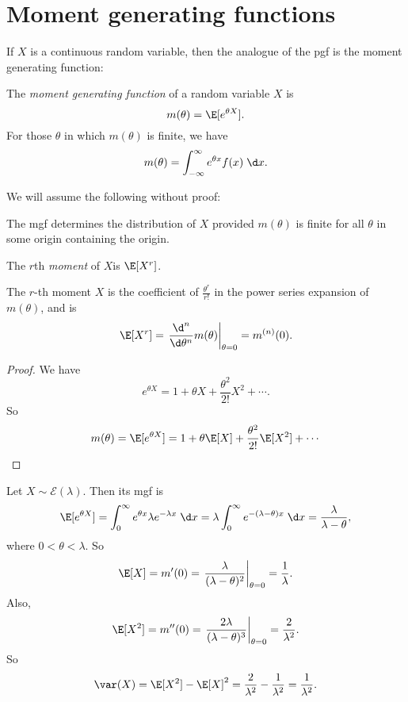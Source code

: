 \documentclass[a4paper]{article}
\begin{document}
\section{Moment generating functions}
If $X$ is a continuous random variable, then the analogue of the pgf is the moment generating function:
\begin{defi}
  The \emph{moment generating function} of a random variable $X$ is
  \[
    m(\theta) = \E[e^{\theta X}].
  \]
  For those $\theta$ in which $m(\theta)$ is finite, we have
  \[
    m(\theta) = \int_{-\infty}^\infty e^{\theta x}f(x)\;\d x.
  \]
\end{defi}

We will assume the following without proof:
\begin{thm}
  The mgf determines the distribution of $X$ provided $m(\theta)$ is finite for all $\theta$ in some origin containing the origin.
\end{thm}

\begin{defi}[Moment]
  The $r$th \emph{moment} of $X$is $\E[X^r]$.
\end{defi}

\begin{thm}[]
  The $r$-th moment $X$ is the coefficient of $\frac{\theta^r}{r!}$ in the power series expansion of $m(\theta)$, and is
  \[
    \E[X^r] = \left.\frac{\d ^n}{\d \theta^n}m(\theta)\right|_{\theta = 0} = m^{(n)}(0).
  \]
\end{thm}

\begin{proof}
  We have
  \[
    e^{\theta X} = 1 + \theta X + \frac{\theta^2}{2!}X^2 + \cdots.
  \]
  So
  \[
    m(\theta) = \E[e^{\theta X}] = 1 + \theta \E[X] + \frac{\theta^2}{2!}\E [X^2] + \cdots
  \]
\end{proof}

\begin{eg}
  Let $X\sim \mathcal{E}(\lambda)$. Then its mgf is
  \[
    \E[e^{\theta X}] = \int_0^\infty e^{\theta x}\lambda e^{-\lambda x}\;\d x = \lambda\int_0^\infty e^{-(\lambda - \theta )x}\;\d x = \frac{\lambda}{\lambda - \theta},
  \]
  where $0 < \theta < \lambda$. So
  \[
    \E[X] = m'(0) = \left.\frac{\lambda}{(\lambda - \theta)^2}\right|_{\theta = 0} = \frac{1}{\lambda}.
  \]
  Also,
  \[
    \E[X^2] = m''(0) = \left.\frac{2\lambda}{(\lambda - \theta)^3}\right|_{\theta = 0} = \frac{2}{\lambda^2}.
  \]
  So
  \[
    \var(X) = \E[X^2] - \E[X]^2 = \frac{2}{\lambda^2} - \frac{1}{\lambda^2} = \frac{1}{\lambda^2}.
  \]
\end{eg}
\end{document}
